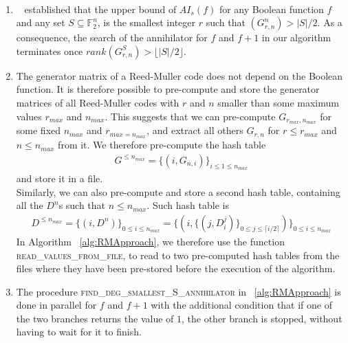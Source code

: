 \documentclass[11pt]{llncs}
\begin{document}
\begin{remark}~\label{rem:remarksOnAlg}
	\begin{enumerate}
		\item ~\cite{TOSC:CarMeaRot17} established that the upper bound of $AI_s(f)$ for any Boolean function $f$ and any set $S\subseteq \mathbb{F}_2^n$, is the smallest integer $r$ such that $\left(G_{r,n}^n\right) > |S| / 2$. As a consequence, the search of the annihilator for $f$ and $f+ 1$ in our algorithm terminates once $rank\left(G_{r,n}^S\right) > \lfloor{|S| / 2}\rfloor$.\label{item:Item1RemOnAlg}
		\item The generator matrix of a Reed-Muller code does not depend on the Boolean function. It is therefore possible to pre-compute and store the generator matrices of all Reed-Muller codes with $r$ and $n$ smaller than some maximum values $r_{max}$ and $n_{max}$.
		This suggests that we can pre-compute $G_{r_{max}, n_{max}}$ for some fixed $n_{max}$ and $r_{max = n_{max}}$, and extract all others $G_{r,n}$ for $r \leq r_{max}$ and $n \leq n_{max}$ from it.
		We therefore pre-compute the hash table
		\begin{align}\label{eq:matricesHashTable}
		G^{\leq n_{max}} = \{\left(i, G_{n,i}\right)\}_{i \leq 1 \leq n_{max}}
		\end{align}
		and store it in a file.\\
		Similarly, we can also pre-compute and store a second hash table, containing all the $D^n$s such that $n \leq n_{max}$. Such hash table is
		\begin{align}\label{eq:degreesHashTable}
		D^{\leq n_{max}} =  \{\left(i,D^{n} \right)\}_{0 \leq i \leq n_{max}} =  \{\left(i, \{ \left(j, D_i^j\right)\}_{0\leq j \leq \lceil{i/2}\rceil} \right)\}_{0 \leq i \leq n_{max}}
		\end{align}
		In Algorithm ~\ref{alg:RMApproach}, we therefore use the function \textsc{read\_values\_from\_file}, to read to two pre-computed hash tables from the files where they have been pre-stored before the execution of the algorithm.
		\item The procedure \textsc{find\_deg\_smallest\_S\_annihilator} in ~\ref{alg:RMApproach} is done in parallel for $f$ and $f+ 1$ with the additional condition that if one of the two branches returns the value of $1$, the other branch is stopped, without having to wait for it to finish.
	\end{enumerate}	
\end{remark}
\end{document}
